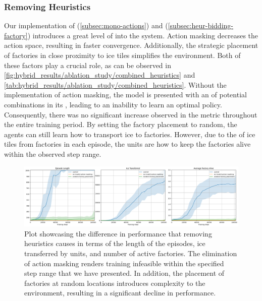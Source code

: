 \subsubsection{Removing Heuristics}

\noindent Our implementation of  (\autoref{subsec:mono-actions}) and  (\autoref{subsec:heur-bidding-factory}) introduces a great level of  into the system. Action masking decreases the action space, resulting in faster convergence. Additionally, the strategic placement of factories in close proximity to ice tiles simplifies the environment. Both of these factors play a crucial role, as can be observed in \autoref{fig:hybrid_results/ablation_study/combined_heuristics} and \autoref{tab:hybrid_results/ablation_study/combined_heuristics}. Without the implementation of action masking, the model is presented with an  of potential combinations in its , leading to an inability to learn an optimal policy. Consequently, there was no significant increase observed in the  metric throughout the entire training period. By setting the factory placement to random, the agents can still learn how to transport ice to factories. However, due to the  of ice tiles from factories in each episode, the units are  how to keep the factories alive within the observed step range.

\begin{figure}[htbp]
    \centering
    \includegraphics[width=0.95\linewidth]{images/results_hybrid/ablation_study/combined_heuristics.png}
    \captionsetup{justification=justified, singlelinecheck=false, width=1\linewidth, labelfont=bf} 
    \caption[]{Plot showcasing the difference in performance that removing heuristics causes in terms of the length of the episodes, ice transferred by units, and number of active factories. The elimination of action masking renders training infeasible within the specified step range that we have presented. In addition, the placement of factories at random locations introduces complexity to the environment, resulting in a significant decline in performance.}
    \label{fig:hybrid_results/ablation_study/combined_heuristics}
\end{figure}

